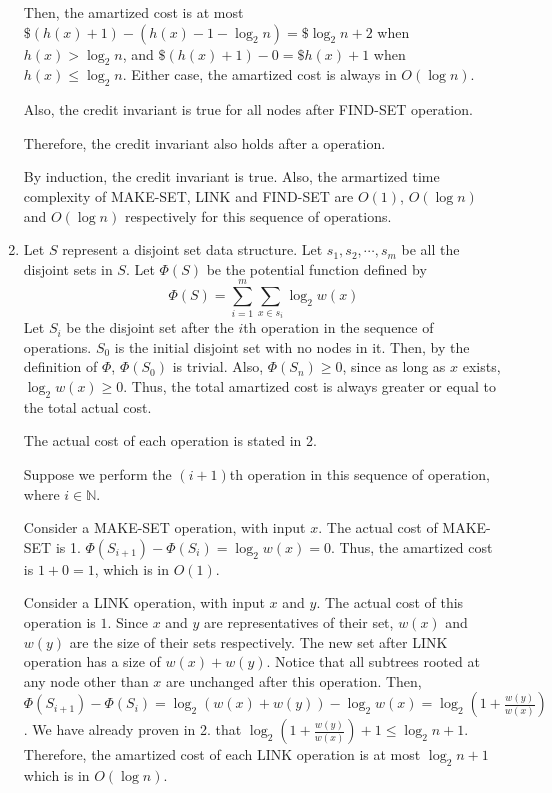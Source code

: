 \documentclass[10pt]{article}
\begin{document}
\begin{enumerate}
		Then, the amartized cost is at most $\$(h(x)+1) - (h(x)-1-\log_2n) =
		\$\log_2n + 2$ when $h(x) > \log_2n$, and $\$(h(x)+1)-0 = \$h(x)+1$
		when $h(x) \leq \log_2n$.
		Either case, the amartized cost is always in $O(\log n)$.
		
		Also, the credit invariant is true for all nodes after FIND-SET
		operation. 

		
		Therefore, the credit invariant also holds after a operation.

		By induction, the credit invariant is true.
		Also, the armartized time complexity of MAKE-SET, LINK and FIND-SET are
		$O(1)$, $O(\log n)$ and $O(\log n)$ respectively for this sequence of
		operations.

	\begin{comment}
	Using the potential method, prove that the amartized complexity of MAKE-SET is $O(1)$
	and the amartized complexity of LINK and FIND-SET are $O(\log(n))$, where $n$ is the number of
	MAKE-SET operations that have been performed.
	\end{comment}
	\item
		Let $S$ represent a disjoint set data structure. 
		Let $s_1, s_2, \cdots, s_m$ be all the disjoint sets in $S$.
		Let $\Phi(S)$ be the potential function defined by 
		$$\Phi(S) = \sum_{i=1}^{m}\sum_{x \in s_i} \log_2w(x)$$
		Let $S_i$ be the disjoint set after the $i$th operation in the sequence
		of operations. 
		$S_0$ is the initial disjoint set with no nodes in it.
		Then, by the definition of $\Phi$, $\Phi(S_0)$ is trivial.
		Also, $\Phi(S_n) \geq 0$, since as long as $x$ exists, $\log_2w(x) \geq
		0$.
		Thus, the total amartized cost is always greater or equal to the total
		actual cost.

		The actual cost of each operation is stated in 2.


		Suppose we perform the $(i+1)$th operation in this sequence of
		operation, where $i \in \mathbb{N}$.


		Consider a MAKE-SET operation, with input $x$.
		The actual cost of MAKE-SET is 1.
		$\Phi(S_{i+1}) - \Phi(S_i) = \log_2w(x) = 0$.
		Thus, the amartized cost is $1 + 0 = 1$, which is in $O(1)$.


		Consider a LINK operation, with input $x$ and $y$.
		The actual cost of this operation is $1$.
		Since $x$ and $y$ are representatives of their set, $w(x)$ and $w(y)$
		are the size of their sets respectively. 
		The new set after LINK operation has a size of $w(x)+w(y)$.
		Notice that all subtrees rooted at any node other than $x$ are
		unchanged after this operation. 
		Then, $\Phi(S_{i+1}) - \Phi(S_i) = \log_2(w(x)+w(y)) - \log_2w(x)
		= \log_2(1+\frac{w(y)}{w(x)})$.
		We have already proven in 2. that $\log_2(1+\frac{w(y)}{w(x)}) + 1 \leq
		\log_2n + 1$.
		Therefore, the amartized cost of each LINK operation is at most
		$\log_2n+1$ which is in $O(\log n)$.



\end{enumerate}
\end{document}
